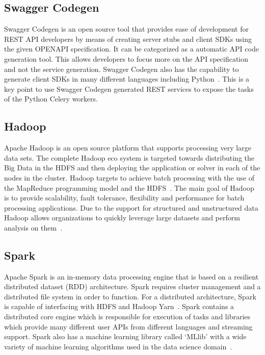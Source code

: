 \subsection{Swagger Codegen}

Swagger Codegen is an open source tool that provides ease of development for 
REST API developers by means of creating server stubs and client SDKs using 
the given OPENAPI specification. It can be categorized as a automatic API code 
generation tool. This allows developers to focus more on the API 
specification and not the service generation. Swagger Codegen also has the 
capability to generate client SDKs in many different languages including 
Python~\cite{hid-sp18-416-www-swagger-codegen}. This is a key point to use 
Swagger Codegen generated REST services to expose the tasks of the Python 
Celery workers. 

\subsection{Hadoop}

Apache Hadoop is an open source platform that supports processing very large 
data sets. The complete Hadoop eco system is targeted towards distributing the 
Big Data in the HDFS and then deploying the application or solver in each of 
the nodes in the cluster. Hadoop targets to achieve batch processing with the 
use of the MapReduce programming model and the 
HDFS~\cite{hid-sp18-416-www-apache-hadoop}. The main goal of Hadoop is to 
provide scalability, fault tolerance, flexibility and performance for batch 
processing applications. Due to the support for structured and unstructured 
data Hadoop allows organizations to quickly leverage large datasets and 
perform analysis on them~\cite{hid-sp18-416-www-hadoop-hortonworks-blog}.

\subsection{Spark}

Apache Spark is an in-memory data processing engine that is based on a 
resilient distributed dataset (RDD) architecture. Spark requires cluster 
management and a distributed file system in order to function. For a 
distributed architecture, Spark is capable of interfacing with HDFS and Hadoop 
Yarn~\cite{hid-sp18-416-www-spark-wikipedia}. Spark contains a distributed 
core engine which is responsible for execution of tasks and libraries which 
provide many different user APIs from different languages and streaming 
support. Spark also has a machine learning library called `MLlib' with a wide 
variety of machine learning algorithms used in the data science 
domain~\cite{hid-sp18-416-www-spark-hortonworks-blog}.

